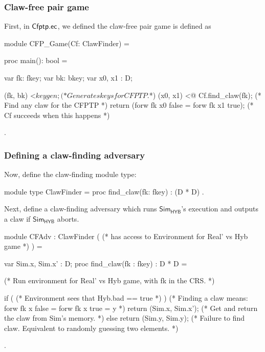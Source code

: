 \documentclass{article}[12pt]
\newcommand{\Simulator}{{\mathsf{Sim}}} %
\newcommand{\Hyb}{{\mathsf{HYB}}}
\newcommand{\Real}{{\mathsf{REAL}}}
\begin{document}
\subsubsection{Claw-free pair game}

First, in ${\sf Cfptp.ec}$, we defined the claw-free pair game is defined as

\begin{easycrypt}[label=code:mod_cfgame, caption={Module representing the claw-finding game.}]
module CFP_Game(Cf: ClawFinder) = {
	proc main(): bool = {
		var fk: fkey; var bk: bkey;
		var x0, x1 : D;

		(fk, bk) <$ keygen;             (* Generates keys for CFPTP. $*)
		(x0, x1) <@ Cf.find_claw(fk);   (* Find any claw for the CFPTP *)
		return (forw fk x0 false = forw fk x1 true); (* Cf succeeds when this happens *)
	}
}.
\end{easycrypt}

\subsubsection{Defining a claw-finding adversary}

Now, define the claw-finding module type:

\begin{easycrypt}[label=code:mod_type_cfadv, caption={Module type for a claw-finding adversary.}]
module type ClawFinder = {
	proc find_claw(fk: fkey) : (D * D)
}.
\end{easycrypt}

Next, define a claw-finding adversary which runs $\Simulator_\Hyb$'s execution and outputs a claw if $\Simulator_\Hyb$ aborts.

\begin{easycrypt}[label=code:mod_cfadv, caption={Module instantiating a claw-finding adversary using access to an environment distinguishing $\Real'$ and $\Hyb$.}]
module CFAdv : ClawFinder ( (* has access to Environment for Real' vs Hyb game *) ) = {
	var Sim.x, Sim.x' : D;
	proc find_claw(fk : fkey) : D * D = {

		(* Run environment for Real' vs Hyb game, with fk in the CRS. *)

		if ( (* Environment sees that Hyb.bad == true *) ) {
			(* Finding a claw means: forw fk x false = forw fk x true = y *)
			return (Sim.x, Sim.x'); (* Get and return the claw from Sim's memory. *)
		}
		else {
			return (Sim.y, Sim.y); (* Failure to find claw. Equivalent to randomly guessing two elements. *)
		}
	}
}.
\end{easycrypt}
\end{document}
